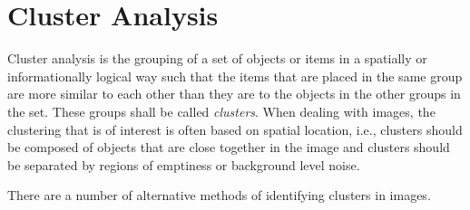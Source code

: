 
\part{Cluster Analysis}
\label{prt:cluster_analysis}

Cluster analysis is the grouping of a set of objects or items in a spatially or
informationally logical way such that the items that are placed in the same
group are more similar to each other than they are to the objects in the other
groups in the set. These groups shall be called \emph{clusters}. When dealing
with images, the clustering that is of interest is often based on spatial
location, i.e., clusters should be composed of objects that are close together
in the image and clusters should be separated by regions of emptiness or
background level noise.

There are a number of alternative methods of identifying clusters in images.
